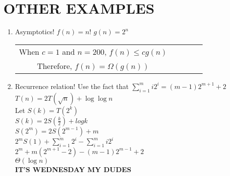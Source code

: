 \documentclass{article}
\begin{document}
\section*{OTHER EXAMPLES}
\begin{enumerate}
\item Asymptotics!
	$f(n)=n!$ $g(n)=2^n$\\
    \begin{center}
    	\begin{tabular} {c c c c c}
        	When $c=1$ and $n=200$, $f(n)\leq cg(n)$\\
            Therefore, $f(n)=\Omega(g(n))$\\
        \end{tabular}
	\end{center}
\item Recurrence relation! Use the fact that $\sum_{i=1}^{m}i2^i=(m-1)2^{m+1}+2$\\
$T(n)=2T(\sqrt{n})+\log\log{n}$\\
Let $S(k)=T(2^k)$\\
$S(k)=2S(\frac{k}{2})+log{k}$\\
$S(2^{m})=2S(2^{m-1})+m$\\
$2^{m}S(1)+\sum_{i=1}^{m}2^{i}-\sum_{i=1}^{m}i2^{i}$\\
$2^{m}+m(2^{m+1}-2)-(m-1)2^{m-1}+2$\\
$\Theta(\log{n})$\\
\textbf{IT'S WEDNESDAY MY DUDES}
\end{enumerate}
\end{document}
